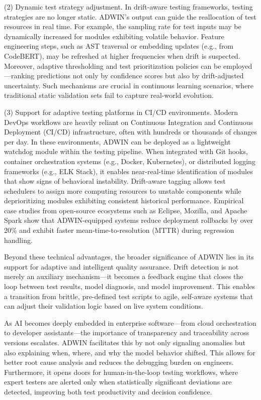 \documentclass[manuscript,screen,review]{acmart}
\begin{document}
(2) Dynamic test strategy adjustment.
In drift-aware testing frameworks, testing strategies are no longer static. ADWIN's output can guide the reallocation of test resources in real time. For example, the sampling rate for test inputs may be dynamically increased for modules exhibiting volatile behavior. Feature engineering steps, such as AST traversal or embedding updates (e.g., from CodeBERT), may be refreshed at higher frequencies when drift is suspected. Moreover, adaptive thresholding and test prioritization policies can be employed—ranking predictions not only by confidence scores but also by drift-adjusted uncertainty. Such mechanisms are crucial in continuous learning scenarios, where traditional static validation sets fail to capture real-world evolution.

(3) Support for adaptive testing platforms in CI/CD environments.
Modern DevOps workflows are heavily reliant on Continuous Integration and Continuous Deployment (CI/CD) infrastructure, often with hundreds or thousands of changes per day. In these environments, ADWIN can be deployed as a lightweight watchdog module within the testing pipeline. When integrated with Git hooks, container orchestration systems (e.g., Docker, Kubernetes), or distributed logging frameworks (e.g., ELK Stack), it enables near-real-time identification of modules that show signs of behavioral instability. Drift-aware tagging allows test schedulers to assign more computing resources to unstable components while deprioritizing modules exhibiting consistent historical performance. Empirical case studies from open-source ecosystems such as Eclipse, Mozilla, and Apache Spark show that ADWIN-equipped systems reduce deployment rollbacks by over 20\% and exhibit faster mean-time-to-resolution (MTTR) during regression handling.

Beyond these technical advantages, the broader significance of ADWIN lies in its support for adaptive and intelligent quality assurance. Drift detection is not merely an auxiliary mechanism—it becomes a feedback engine that closes the loop between test results, model diagnosis, and model improvement. This enables a transition from brittle, pre-defined test scripts to agile, self-aware systems that can adjust their validation logic based on live system conditions.

As AI becomes deeply embedded in enterprise software—from cloud orchestration to developer assistants—the importance of transparency and traceability across versions escalates. ADWIN facilitates this by not only signaling anomalies but also explaining when, where, and why the model behavior shifted. This allows for better root cause analysis and reduces the debugging burden on engineers. Furthermore, it opens doors for human-in-the-loop testing workflows, where expert testers are alerted only when statistically significant deviations are detected, improving both test productivity and decision confidence.
\end{document}
